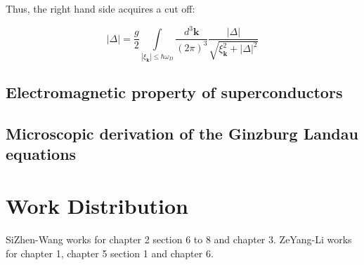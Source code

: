 ﻿\documentclass[twoside]{book}
\numberwithin{equation}{section}
\begin{document}
Thus, the right hand side acquires a cut off:

\[|\Delta|=\frac{g}{2}\underset{|\xi_{\bm{k}}|\le\hbar\omega_D}{\int}\frac{d^3 \bm{k}}{(2\pi)^3}\frac{|\Delta|}{\sqrt{\xi_{\bm{k}}^2+|\Delta|^2}} \]


\section{Electromagnetic property of superconductors}
\section{Microscopic derivation of the Ginzburg Landau equations}

\newpage

\chapter*{Work Distribution}
SiZhen-Wang works for chapter 2 section 6 to 8 and chapter 3. ZeYang-Li works for chapter 1, chapter 5 section 1 and chapter 6. 
\end{document}
